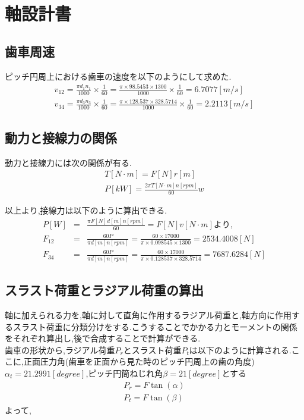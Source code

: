 \documentclass[a4j,twoside,openright,11pt]{jreport}
\begin{document}
\chapter{軸設計書}
\section{歯車周速}
ピッチ円周上における歯車の速度を以下のようにして求めた.
\begin{eqnarray}
v_{12}=\frac{\pi d_1 n_1}{1000} \times \frac{1}{60} = \frac{\pi \times 98.5453 \times 1300}{1000} \times \frac{1}{60} = 6.7077 [m/s]\\
v_{34}=\frac{\pi d_3 n_3}{1000} \times \frac{1}{60} = \frac{\pi \times 128.537 \times 328.5714}{1000} \times \frac{1}{60} = 2.2113 [m/s]
\end{eqnarray}

\section{動力と接線力の関係}
動力と接線力には次の関係が有る.
\begin{eqnarray}
T[N \cdot m]=F[N] r[m]\\
P[kW] = \frac{2\pi T[N \cdot m] n[rpm] }{60}w
\end{eqnarray}

以上より,接線力は以下のように算出できる.
\begin{eqnarray}
P[W] &=& \frac{\pi F[N] d[m] n[rpm] }{60}=F[N]v[N \cdot m]より,\nonumber\\
F_{12}&=& \frac{60P}{\pi d[m] n[rpm] } = \frac{60 \times 17000}{\pi \times 0.098545 \times  1300 } = 2534.4008[N]\\
F_{34}&=& \frac{60P}{\pi d[m] n[rpm] } = \frac{60 \times 17000}{\pi \times 0.128537 \times 328.5714} = 7687.6284[N]
\end{eqnarray}

\section{スラスト荷重とラジアル荷重の算出}
軸に加えられる力を,軸に対して直角に作用するラジアル荷重と,軸方向に作用するスラスト荷重に分類分けをする.こうすることでかかる力とモーメントの関係をそれぞれ算出し,後で合成することで計算ができる.\\
歯車の形状から,ラジアル荷重$P_r$とスラスト荷重$P_t$は以下のように計算される.ここに,正面圧力角(歯車を正面から見た時のピッチ円周上の歯の角度)$\alpha_t=21.2991[degree]$,ピッチ円筒ねじれ角$
\beta =21[degree]$とする\\
\begin{eqnarray}
P_r = F\tan(\alpha)\\
P_t = F\tan(\beta)
\end{eqnarray}
よって,
\end{document}
